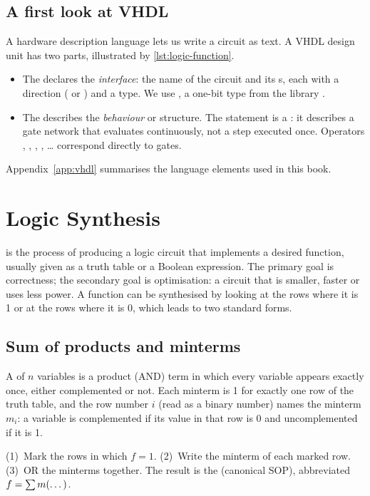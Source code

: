 \subsection{A first look at VHDL}
A hardware description language lets us write a circuit as text. A VHDL design unit has two parts, illustrated by \cref{lst:logic-function}.
\begin{itemize}
  \item The  declares the \emph{interface}: the name of the circuit and its s, each with a direction ( or ) and a type. We use , a one-bit type from the library .
  \item The  describes the \emph{behaviour} or structure. The statement  is a : it describes a gate network that evaluates continuously, not a step executed once. Operators , , , , \dots{} correspond directly to gates.
\end{itemize}
Appendix~\ref{app:vhdl} summarises the language elements used in this book.

\section{Logic Synthesis}\label{sec:synthesis}
 is the process of producing a logic circuit that implements a desired function, usually given as a truth table or a Boolean expression. The primary goal is correctness; the secondary goal is optimisation: a circuit that is smaller, faster or uses less power. A function can be synthesised by looking at the rows where it is 1 or at the rows where it is 0, which leads to two standard forms.

\subsection{Sum of products and minterms}
A  of $n$ variables is a product (AND) term in which every variable appears exactly once, either complemented or not. Each minterm is 1 for exactly one row of the truth table, and the row number $i$ (read as a binary number) names the minterm $m_i$: a variable is complemented if its value in that row is 0 and uncomplemented if it is 1.

\begin{keypoint}
(1)~Mark the rows in which $f=1$. (2)~Write the minterm of each marked row. (3)~OR the minterms together. The result is the  (canonical SOP), abbreviated $f=\sum m(\dots)$.
\end{keypoint}


